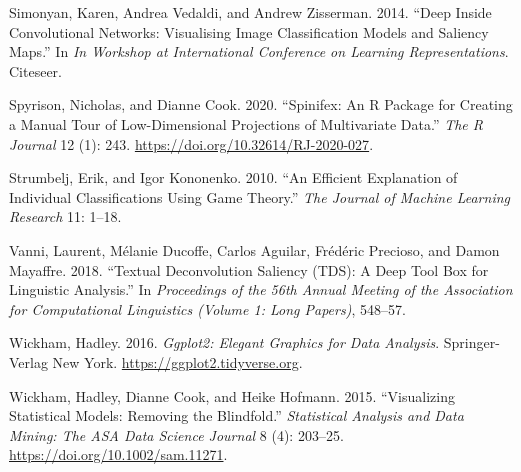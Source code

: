 \documentclass[
]{article}
\newlength{\cslhangindent}
\newlength{\cslentryspacingunit} %
\newenvironment{CSLReferences}[2] %
 {%
  \setlength{\parindent}{0pt}
  \ifodd #1
  \let\oldpar\par
  \def\par{\hangindent=\cslhangindent\oldpar}
  \fi
  \setlength{\parskip}{#2\cslentryspacingunit}
 }%
 {}
\begin{document}
\begin{CSLReferences}{1}{0}
\leavevmode{}%
Simonyan, Karen, Andrea Vedaldi, and Andrew Zisserman. 2014. {``Deep
Inside Convolutional Networks: {Visualising} Image Classification Models
and Saliency Maps.''} In \emph{In {Workshop} at {International}
{Conference} on {Learning} {Representations}}. Citeseer.

\leavevmode{}%
Spyrison, Nicholas, and Dianne Cook. 2020. {``Spinifex: An {R} {Package}
for {Creating} a {Manual} {Tour} of {Low}-Dimensional {Projections} of
{Multivariate} {Data}.''} \emph{The R Journal} 12 (1): 243.
\url{https://doi.org/10.32614/RJ-2020-027}.

\leavevmode{}%
Strumbelj, Erik, and Igor Kononenko. 2010. {``An Efficient Explanation
of Individual Classifications Using Game Theory.''} \emph{The Journal of
Machine Learning Research} 11: 1--18.

\leavevmode{}%
Vanni, Laurent, Mélanie Ducoffe, Carlos Aguilar, Frédéric Precioso, and
Damon Mayaffre. 2018. {``Textual {Deconvolution} {Saliency} ({TDS}): A
Deep Tool Box for Linguistic Analysis.''} In \emph{Proceedings of the
56th {Annual} {Meeting} of the {Association} for {Computational}
{Linguistics} ({Volume} 1: {Long} {Papers})}, 548--57.

\leavevmode{}%
Wickham, Hadley. 2016. \emph{Ggplot2: {Elegant} {Graphics} for {Data}
{Analysis}}. Springer-Verlag New York.
\url{https://ggplot2.tidyverse.org}.

\leavevmode{}%
Wickham, Hadley, Dianne Cook, and Heike Hofmann. 2015. {``Visualizing
Statistical Models: {Removing} the Blindfold.''} \emph{Statistical
Analysis and Data Mining: The ASA Data Science Journal} 8 (4): 203--25.
\url{https://doi.org/10.1002/sam.11271}.

\end{CSLReferences}
\end{document}
